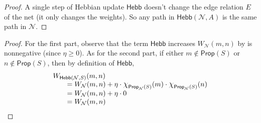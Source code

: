 \documentclass[letterpaper]{article}
\theoremstyle{definition}
\newcommand*{\bigchi}{\mbox{\Large$\chi$}}%
\newcommand{\Net}{\mathcal{N}}
\newcommand{\Prop}{\mathsf{Prop}}
\newcommand{\Hebb}[2]{\mathsf{Hebb}(#1, #2)}
\newcommand{\HebbNoArgs}{\mathsf{Hebb}}
\begin{document}
\hebbreach*
\begin{proof}
    A single step of Hebbian update $\HebbNoArgs$ doesn't change the edge relation $E$ of the net (it only changes the weights).  So any path in $\Hebb{\Net}{A}$ is the same path in $\Net$. \qedhere
\end{proof}

\hebbweights*
\begin{proof}
    For the first part, observe that the term $\HebbNoArgs$ increases $W_\Net(m, n)$ by is nonnegative (since $\eta \geq 0$).  As for the second part, if either $m \not \in \Prop(S)$ or $n \not \in \Prop(S)$, then by definition of $\HebbNoArgs$,
    \[\arraycolsep=1.4pt
    \begin{array}{l}
        W_{\Hebb{\Net}{S}}(m, n)\\
        
        \quad \quad = W_\Net(m, n) + \eta \cdot \bigchi_{\Prop_\Net(S)}(m) \cdot \bigchi_{\Prop_\Net(S)}(n)\\

        \quad \quad = W_\Net(m, n) + \eta \cdot 0\\
        \quad \quad = W_\Net(m, n)
    \end{array} \qedhere
    \]
\end{proof}
\end{document}
